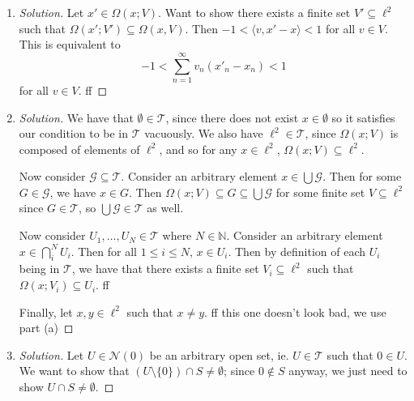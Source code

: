 \documentclass{article}
\newcommand{\N}{{\mathbb N}}
\begin{document}
\begin{enumerate}
	\item \begin{proof}[Solution]\let\qed\relax
		Let $x' \in \Omega(x;V)$.
		Want to show there exists a finite set $V' \subseteq \ell^2$
		such that $\Omega(x';V') \subseteq \Omega(x,V)$.
		Then $-1 < \langle v, x' - x \rangle < 1$ for all $v \in V$.
		This is equivalent to
		\[
			-1 < \sum_{n = 1}^\infty v_n(x'_n - x_n) < 1
		\]
		for all $v \in V$.
		ff
	\end{proof}
	\item \begin{proof}[Solution]\let\qed\relax
		We have that $\emptyset \in \mathcal{T}$,
		since there does not exist $x \in \emptyset$ so it
		satisfies our condition to be in $\mathcal{T}$ vacuously.
		We also have $\ell^2 \in \mathcal{T}$,
		since $\Omega(x;V)$ is composed of elements of $\ell^2$,
		and so for any $x \in \ell^2$, $\Omega(x;V) \subseteq \ell^2$.
		
		Now consider $\mathcal{G} \subseteq \mathcal{T}$.
		Consider an arbitrary element $x \in \bigcup \mathcal{G}$.
		Then for some $G \in \mathcal{G}$, we have $x \in G$.
		Then $\Omega(x;V) \subseteq G \subseteq \bigcup\mathcal{G}$
		for some finite set $V \subseteq \ell^2$ since $G \in \mathcal{T}$,
		so $\bigcup \mathcal{G} \in \mathcal{T}$ as well.

		Now consider $U_1,\dots,U_N \in \mathcal{T}$ where $N \in \N$.
		Consider an arbitrary element $x \in \bigcap_i^N U_i$.
		Then for all $1 \leq i \leq N$, $x \in U_i$.
		Then by definition of each $U_i$ being in $\mathcal{T}$,
		we have that there exists a finite set $V_i \subseteq \ell^2$
		such that $\Omega(x;V_i) \subseteq U_i$.
		ff

		Finally, let $x, y \in \ell^2$ such that $x \neq y$.
		ff this one doesn't look bad, we use part (a)
	\end{proof}
	\item \begin{proof}[Solution]\let\qed\relax
			Let $U \in \mathcal{N}(0)$ be an arbitrary open set,
			ie. $U \in \mathcal{T}$ such that $0 \in U$.
			We want to show that $(U\setminus\{0\})\cap S \neq \emptyset$;
			since $0 \not\in S$ anyway, we just need to show
			$U \cap S \neq \emptyset$.


\end{proof}
\end{enumerate}
\end{document}
